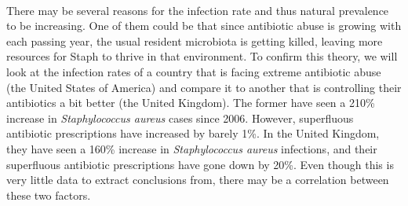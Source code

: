\paragraph{}There may be several reasons for the infection rate and thus natural prevalence to be increasing. One of them could be that since antibiotic abuse is growing with each passing year, the usual resident microbiota is getting killed, leaving more resources for Staph to thrive in that environment. To confirm this theory, we will look at the infection rates of a country that is facing extreme antibiotic abuse (the United States of America) and compare it to another that is controlling their antibiotics a bit better (the United Kingdom). The former have seen a 210\% increase in \emph{Staphylococcus aureus} cases since 2006. However, superfluous antibiotic prescriptions have increased by barely 1\%\cite{baggsEstimatingNationalTrends2016}. In the United Kingdom, they have seen a 160\% increase in \emph{Staphylococcus aureus} infections\cite{englandMSSABacteraemiaAnnual2021}, and their superfluous antibiotic prescriptions have gone down by 20\%. Even though this is very little data to extract conclusions from, there may be a correlation between these two factors.
